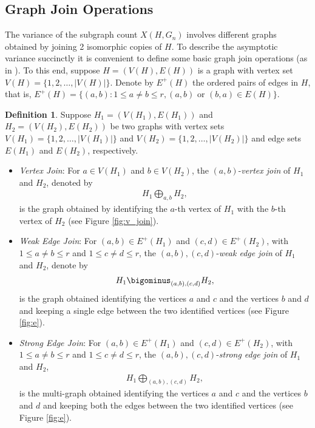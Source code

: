 \documentclass[11pt,reqno]{amsart}
\numberwithin{equation}{section}
\theoremstyle{definition}
\newtheorem{definition}{Definition}[section]
\begin{document}
\subsection{Graph Join Operations} 
\label{sec:vertexedgeab}

The variance of the subgraph count $X(H, G_n)$ involves different graphs obtained by joining 2 isomorphic copies of $H$. To describe the  asymptotic variance succinctly it is convenient to define some basic graph join operations (as in \cite{BCJ}). To this end, suppose $H=(V(H),E(H))$ 
is a graph with vertex set $V(H) = \{1, 2, \ldots, |V(H)|\}$. Denote by $E^+(H)$ the ordered pairs of edges in $H$, that is, $E^{+}(H)=\{(a,b):1\leq a\neq b\leq r, (a,b) \text{ or } (b,a)\in E(H)\}$.


\begin{definition}\label{defn:H1H2ab}
Suppose $H_1 = (V(H_1), E(H_1))$ and $H_2 = (V(H_2), E(H_2))$ be two graphs with vertex sets $V(H_1) = \{1, 2, \ldots, |V(H_1)|\}$ and $V(H_2) = \{1, 2, \ldots, |V(H_2)|\}$ and edge sets $E(H_1)$ and $E(H_2)$, respectively.

\begin{itemize}

\item {\it Vertex Join}: For $a \in V(H_1)$ and $b \in V(H_2)$, the $(a, b)$-{\it vertex join} of $H_1$ and $H_2$, denoted by 
\begin{align*}
H_{1}\bigoplus_{a,b}H_{2}, 
\end{align*}
is the graph obtained by identifying the $a$-th vertex of $H_1$ with the $b$-th vertex of $H_2$ (see Figure \ref{fig:v_join}). 



\item {\it Weak Edge Join}: For $(a,b) \in E^{+}(H_1)$ and $(c,d) \in E^{+}(H_2)$, with $1 \leq a\neq b\leq r$ and $1 \leq c\neq d \leq r$, the $(a, b), (c, d)$-{\it weak edge join} of $H_1$ and $H_2$, denote by 
\begin{align*}
    H_{1}\bigominus_{(a,b),(c,d)}  H_{2} , 
\end{align*}
is the graph obtained identifying the vertices $a$ and $c$ and the vertices $b$ and $d$ and keeping a single edge between the two identified vertices (see Figure \ref{fig:e}).

\item {\it Strong Edge Join}: For $(a,b) \in E^{+}(H_1)$ and $(c,d) \in E^{+}(H_2)$, with $1 \leq a\neq b\leq r$ and $1 \leq c\neq d \leq r$, the $(a, b), (c, d)$-{\it strong edge join} of $H_1$ and $H_2$, 
\begin{align*}
H_{1}\bigoplus_{(a,b),(c,d)}  H_{2} , 
\end{align*} 
is the multi-graph obtained identifying the vertices $a$ and $c$ and the vertices $b$ and $d$ and keeping both the edges between the two identified vertices (see Figure \ref{fig:e}). 
\end{itemize}
\end{definition}
\end{document}
